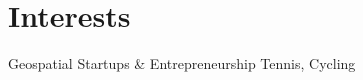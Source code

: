 \documentclass[11pt,a4paper,sans]{moderncv} %
\begin{document}
\section{Interests }

\renewcommand{\listitemsymbol}{-~} %

 {Geospatial Startups \& Entrepreneurship} 
 {Tennis, Cycling  } 









\end{document}
